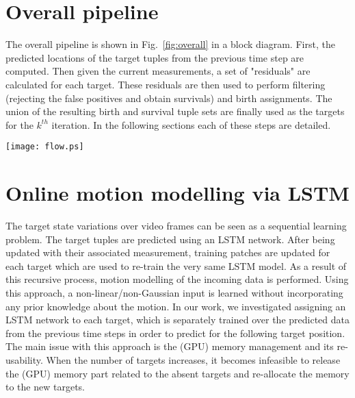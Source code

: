 \documentclass[runningheads]{llncs}
\begin{document}
\section{Overall pipeline}\label{sec:overall}
The overall pipeline is shown in Fig.~\ref{fig:overall} in a block diagram. First, the predicted locations of the target tuples from the previous time step are computed. Then given the current measurements, a set of "residuals" are calculated for each target. These residuals are then used to perform filtering (rejecting the false positives and obtain survivals) and birth assignments. The union of the resulting birth and survival tuple sets are finally used as the targets for the $k^{th}$ iteration. In the following sections each of these steps are detailed.

\begin{figure*}[t]
\centering
\texttt{[image: flow.ps]}
\caption{Overall pipeline of the proposed multi-target filtering algorithm: target tuples set $XLSTM_{k-1}$ is given to the predictor, which loads the LSTM model for each target, trains it over the target's latest data patch and predicts the target state set $\hat{XLSTM}_{k-1}$. The measurement set $Z_k$ is obtained from the detector, which is used to compute the residual set. The filtering, data association and update (correction) steps are then performed over the residual set to remove clutter from the data and assign births, which eventually, form the target tuple set $XLSTM_k$.}
\label{fig:overall}
\end{figure*}

\section{Online motion modelling via LSTM}\label{sec:lstmMerge}


The target state variations over video frames can be seen as a sequential learning problem.
The target tuples are predicted using an LSTM network. After being updated with their associated measurement, training patches are updated for each target which are used to re-train the very same LSTM model. As a result of this recursive process, motion modelling of the incoming data is performed. Using this approach, a non-linear/non-Gaussian input is learned without incorporating any prior knowledge about the motion. 
In our work, we investigated assigning an LSTM network to each target, which is separately trained over the predicted data from the previous time steps in order to predict for the following target position. The main issue with this approach is the (GPU) memory management and its re-usability. When the number of targets increases, it becomes infeasible to release the (GPU) memory part related to the absent targets and re-allocate the memory to the new targets.
\end{document}
